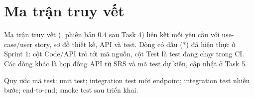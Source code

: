 \section{Ma trận truy vết}\label{sec:trace}

Ma trận truy vết (, phiên bản 0.4 sau Task 4) liên kết mỗi yêu cầu với use-case/user
story, sơ đồ thiết kế, API và test. Dòng có dấu (*) đã hiện thực ở Sprint 1: cột Code/API trỏ tới mã nguồn, cột
Test là test đang chạy trong CI. Các dòng khác là hợp đồng API từ SRS và mã test dự kiến, cập nhật ở Task 5.

Quy ước mã test:  unit test;  integration test một endpoint;  integration test nhiều
bước;  end-to-end;  smoke test sau triển khai.

